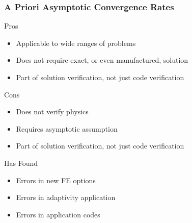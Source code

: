 \begin{frame}
\frametitle{A Priori Asymptotic Convergence Rates}
\begin{block}{Pros}
\begin{itemize}
\item Applicable to wide ranges of problems
\item Does not require exact, or even manufactured, solution
\item Part of solution verification, not just code verification
\end{itemize}
\end{block}

\pause

\begin{block}{Cons}
\begin{itemize}
\item Does not verify physics
\item Requires asymptotic assumption
\item Part of solution verification, not just code verification
\end{itemize}
\end{block}

\pause

\begin{block}{Has Found}
\begin{itemize}
\item Errors in new FE options
\item Errors in adaptivity application
\item Errors in application codes
\end{itemize}
\end{block}
\end{frame}

